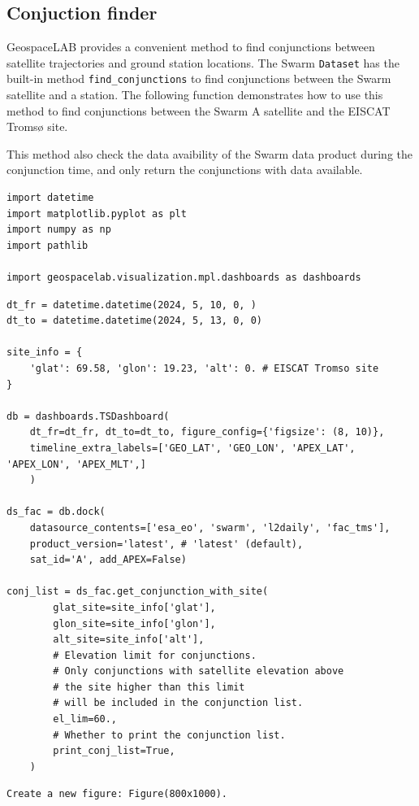 \subsection{Conjuction finder}

GeospaceLAB provides a convenient method to find conjunctions between satellite trajectories and ground station locations. The Swarm \texttt{Dataset} has the built-in method \texttt{find\_conjunctions} to find conjunctions between the Swarm satellite and a station. The following function demonstrates how to use this method to find conjunctions between the Swarm A satellite and the EISCAT Tromsø site.

This method also check the data avaibility of the Swarm data product during the conjunction time, and only return the conjunctions with data available.

\begin{verbatim}
import datetime
import matplotlib.pyplot as plt
import numpy as np
import pathlib

import geospacelab.visualization.mpl.dashboards as dashboards
\end{verbatim}

\begin{verbatim}
dt_fr = datetime.datetime(2024, 5, 10, 0, )
dt_to = datetime.datetime(2024, 5, 13, 0, 0)

site_info = {
    'glat': 69.58, 'glon': 19.23, 'alt': 0. # EISCAT Tromso site
}

db = dashboards.TSDashboard(
    dt_fr=dt_fr, dt_to=dt_to, figure_config={'figsize': (8, 10)},
    timeline_extra_labels=['GEO_LAT', 'GEO_LON', 'APEX_LAT', 'APEX_LON', 'APEX_MLT',]
    )

ds_fac = db.dock(
    datasource_contents=['esa_eo', 'swarm', 'l2daily', 'fac_tms'], 
    product_version='latest', # 'latest' (default),
    sat_id='A', add_APEX=False)

conj_list = ds_fac.get_conjunction_with_site(
        glat_site=site_info['glat'], 
        glon_site=site_info['glon'], 
        alt_site=site_info['alt'],
        # Elevation limit for conjunctions. 
        # Only conjunctions with satellite elevation above 
        # the site higher than this limit 
        # will be included in the conjunction list.
        el_lim=60.,
        # Whether to print the conjunction list.
        print_conj_list=True,
    )
\end{verbatim}

\begin{verbatim}
Create a new figure: Figure(800x1000).
\end{verbatim}

